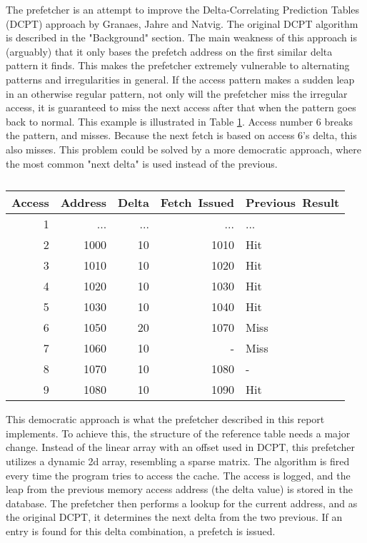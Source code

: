 

The prefetcher is an attempt to improve the Delta-Correlating Prediction Tables (DCPT) approach by Granaes, Jahre and Natvig. The original DCPT algorithm is described in the "Background" section. The main weakness of this approach is (arguably) that it only bases the prefetch address on the first similar delta pattern it finds. This makes the prefetcher extremely vulnerable to alternating patterns and irregularities in general. If the access pattern makes a sudden leap in an otherwise regular pattern, not only will the prefetcher miss the irregular access, it is guaranteed to miss the next access after that when the pattern goes back to normal. This example is illustrated in Table \ref{table:breakDCPT}. Access number 6 breaks the pattern, and misses. Because the next fetch is based on access 6's delta, this also misses. This problem could be solved by a more democratic approach, where the most common "next delta" is used instead of the previous.
\begin{table}[!t]
\renewcommand{\arraystretch}{1.3}
\caption{}
\label{table:breakDCPT}
\centering
\begin{tabular}{|r|r|r|r|l|}
\hline
\bfseries Access & \bfseries Address & \bfseries Delta & \bfseries Fetch~Issued & \bfseries Previous~Result\\
\hline
\hline
1 & ... & ... & ... & ...\\
2 & 1000 & 10 & 1010 & Hit\\
3 & 1010 & 10 & 1020 & Hit\\
4 & 1020 & 10 & 1030 & Hit\\
5 & 1030 & 10 & 1040 & Hit\\
6 & 1050 & 20 & 1070 & Miss\\
7 & 1060 & 10 & - 	 & Miss\\
8 & 1070 & 10 & 1080 & -\\
9 & 1080 & 10 & 1090 & Hit\\
\hline
\end{tabular}
\end{table}

This democratic approach is what the prefetcher described in this report implements. To achieve this, the structure of the reference table needs a major change. Instead of the linear array with an offset used in DCPT, this prefetcher utilizes a dynamic 2d array, resembling a sparse matrix. The algorithm is fired every time the program tries to access the cache. The access is logged, and the leap from the previous memory access address (the delta value) is stored in the database. The prefetcher then performs a lookup for the current address, and as the original DCPT, it determines the next delta from the two previous. If an entry is found for this delta combination, a prefetch is issued. 

